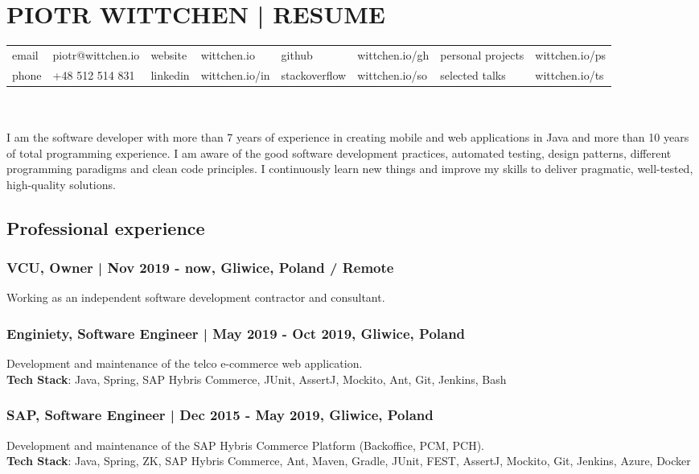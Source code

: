 \documentclass[8pt]{extarticle}
\begin{document}
  \small

  \section*{\large{PIOTR WITTCHEN | RESUME}}

  \begin{tabular}{llllllll}
      email  & piotr@wittchen.io & website  & wittchen.io    & github        & wittchen.io/gh & personal projects & wittchen.io/ps \\
      phone  & +48 512 514 831   & linkedin & wittchen.io/in & stackoverflow & wittchen.io/so & selected talks    & wittchen.io/ts \\
  \end{tabular} \\ \\

    I am the software developer with more than 7 years of experience in creating mobile and web applications in Java and more than 10 years of total programming experience. I am aware of the good software development practices, automated testing, design patterns, different programming paradigms and clean code principles. I continuously learn new things and improve my skills to deliver pragmatic, well-tested, high-quality solutions.

    \subsection*{\normalsize{Professional experience}}

      \subsubsection*{\normalsize{VCU, Owner | Nov 2019 - now, Gliwice, Poland / Remote}}
      Working as an independent software development contractor and consultant.

      \subsubsection*{\normalsize{Enginiety, Software Engineer | May 2019 - Oct 2019, Gliwice, Poland}}
      Development and maintenance of the telco e-commerce web application.\\
      \textbf{Tech Stack}: Java, Spring, SAP Hybris Commerce, JUnit, AssertJ, Mockito, Ant, Git, Jenkins, Bash

      \subsubsection*{\normalsize{SAP, Software Engineer | Dec 2015 - May 2019, Gliwice, Poland}}
      Development and maintenance of the SAP Hybris Commerce Platform (Backoffice, PCM, PCH).\\
      \textbf{Tech Stack}: Java, Spring, ZK, SAP Hybris Commerce, Ant, Maven, Gradle,
      JUnit, FEST, AssertJ, Mockito, Git, Jenkins, Azure, Docker
\end{document}

